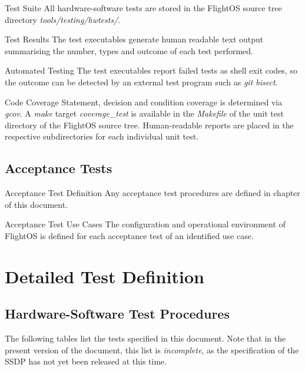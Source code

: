 {Test Suite}{%
All hardware-software tests are stored in the FlightOS source
tree directory \mbox{\emph{tools/testing/hwtests/}}.%
}%
{}{}


{Test Results}{%
The test executables generate human readable text output summarising the number,
types and outcome of each test performed.
}%
{}{}


{\hspace{0pt} Automated Testing}{%
The test executables report failed tests as shell exit codes, so the outcome
can be detected by an external test program such as \emph{git bisect}.
}%
{}{}


{Code Coverage}{%
Statement, decision and condition coverage is determined via \emph{gcov}.
A \emph{make} target \emph{coverage\_test} is available in the \emph{Makefile}
of the unit test directory of the FlightOS source tree.
Human-readable reports are placed in the respective subdirectories for each
individual unit test.
}%
{}{}


\section{Acceptance Tests}

{\hspace{0pt} Acceptance Test Definition}{%
Any acceptance test procedures are defined in chapter
\mbox{} of this document.
}%
{}{}

{\hspace{0pt} Acceptance Test Use Cases}{%
The configuration and operational environment of FlightOS is defined for each
acceptance test of an identified use case.
}%
{}{}


\chapter{Detailed Test Definition}
\label{detailedtestdefinitions}

\section{Hardware-Software Test Procedures}
The following tables list the tests specified in this document. Note that in
the present version of the document, this list is \emph{incomplete}, as the
specification of the \gls{SSDP} has not yet been released at this time.\\

